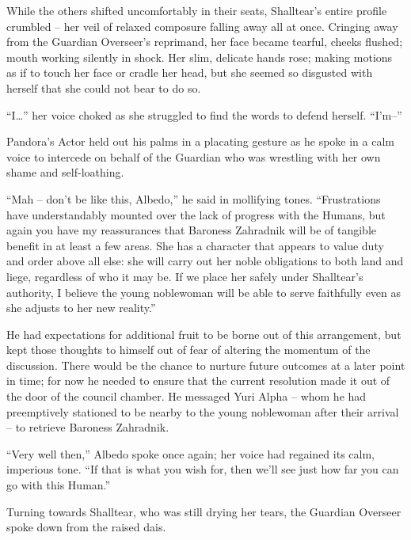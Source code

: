  

While the others shifted uncomfortably in their seats, Shalltear’s entire profile crumbled – her veil of relaxed composure falling away all at once. Cringing away from the Guardian Overseer’s reprimand, her face became tearful, cheeks flushed; mouth working silently in shock. Her slim, delicate hands rose; making motions as if to touch her face or cradle her head, but she seemed so disgusted with herself that she could not bear to do so.

 

“I…” her voice choked as she struggled to find the words to defend herself. “I’m–”

 

Pandora’s Actor held out his palms in a placating gesture as he spoke in a calm voice to intercede on behalf of the Guardian who was wrestling with her own shame and self-loathing.

 

“Mah – don’t be like this, Albedo,” he said in mollifying tones. “Frustrations have understandably mounted over the lack of progress with the Humans, but again you have my reassurances that Baroness Zahradnik will be of tangible benefit in at least a few areas. She has a character that appears to value duty and order above all else: she will carry out her noble obligations to both land and liege, regardless of who it may be. If we place her safely under Shalltear’s authority, I believe the young noblewoman will be able to serve faithfully even as she adjusts to her new reality.”

 

He had expectations for additional fruit to be borne out of this arrangement, but kept those thoughts to himself out of fear of altering the momentum of the discussion. There would be the chance to nurture future outcomes at a later point in time; for now he needed to ensure that the current resolution made it out of the door of the council chamber. He messaged Yuri Alpha – whom he had preemptively stationed to be nearby to the young noblewoman after their arrival – to retrieve Baroness Zahradnik.

 

“Very well then,” Albedo spoke once again; her voice had regained its calm, imperious tone. “If that is what you wish for, then we’ll see just how far you can go with this Human.”

 

Turning towards Shalltear, who was still drying her tears, the Guardian Overseer spoke down from the raised dais.

